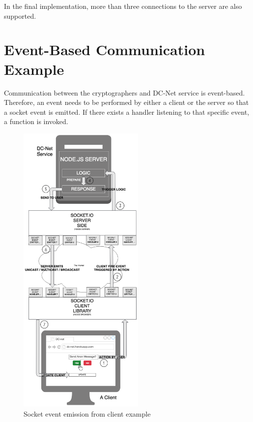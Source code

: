 In the final implementation, more than three connections to the server are also supported.

\section{Event-Based Communication Example}
Communication between the cryptographers and DC-Net service is event-based. Therefore, an event needs to be performed by either a client or the server so that a socket event is emitted. If there exists a handler listening to that specific event, a function is invoked. 

\begin{figure}[H]
    \centering
    \includegraphics[width=0.55\textwidth]{Images/Design/socketEventEmission.png}
    \caption{Socket event emission from client example}
    \label{fig:socketEventEmission}
\end{figure}

